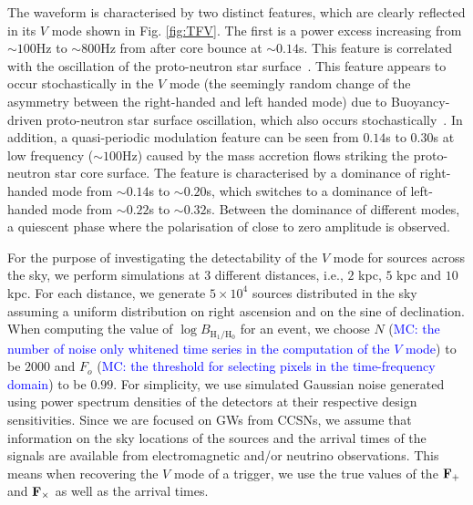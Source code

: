 \documentclass[aps,twocolumn,showpacs,groupedaddress, nofootinbib]{revtex4}  %
\newcommand{\MC}[1]{\textcolor{blue}{MC: #1}}
\begin{document}
The waveform is characterised by two distinct features, which are clearly reflected in its $V$ mode shown in Fig. \ref{fig:TFV}.
The first is a power excess increasing from $\sim100$Hz to $\sim800$Hz from after core bounce at $\sim 0.14$s. 
This feature is correlated with the oscillation of the proto-neutron star surface~\cite{muller2013new}.
This feature appears to occur stochastically in the $V$ mode (the seemingly random change of the asymmetry between the right-handed and left handed mode) 
due to Buoyancy-driven proto-neutron star surface oscillation, which also occurs stochastically~\cite{murphy2009model}. 
In addition, a quasi-periodic modulation feature can be seen from $0.14$s to $0.30$s at low frequency ($\sim100$Hz) 
caused by the mass accretion flows striking the proto-neutron star core surface.
The feature is characterised by a dominance of right-handed mode from $\sim 0.14$s to $\sim 0.20$s, which switches to a dominance of left-handed mode 
from $\sim 0.22$s to $\sim 0.32$s. 
Between the dominance of different modes, a quiescent phase where the polarisation of close to zero amplitude is observed.

For the purpose of investigating the detectability of the $V$ mode for sources across the sky, 
we perform simulations at $3$ different distances, 
i.e., $2$ kpc, $5$ kpc and $10$ kpc.
For each distance, we generate $5\times 10^4$ sources distributed in the sky assuming a uniform distribution on right ascension and on the sine of declination.
When computing the value of $\log {B_{\text{H}_1 / \text{H}_0}}$ for an event, we choose $N$ (\MC{the number of noise only whitened time series in the computation of the $V$ mode}) 
to be $2000$ and $F_o$ (\MC{the threshold for selecting pixels in the time-frequency domain}) to be $0.99$. 
For simplicity, we use simulated Gaussian noise generated using
power spectrum densities of the detectors at their respective design sensitivities. 
Since we are focused on \acp{GW} from \acp{CCSN}, 
we assume that information on the sky locations of the sources and the arrival times of the signals are available from
electromagnetic and/or neutrino observations. 
This means when recovering the $V$ mode of a trigger, 
we use the true values of the $\bold{F}_+$ and $\bold{F}_{\times}$ as well as the arrival times.
\end{document}
